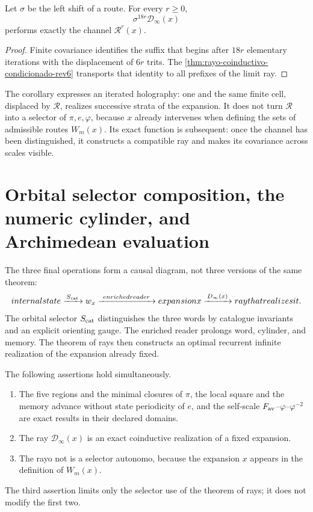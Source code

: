 \begin{corollary}
\label{cor:covarianza-rayo-729-rev6}
Let \(\sigma\) be the left shift of a route. For every
\(r\geq0\),
\[
\sigma^{18r}\mathcal D_\infty(x)
\]
performs exactly the channel \(\mathcal R^r(x)\).
\end{corollary}

\begin{proof}
Finite covariance identifies the suffix that begins after \(18r\)
elementary iterations
with the displacement of \(6r\) trits. The
\cref{thm:rayo-coinductivo-condicionado-rev6} transports that identity to
all prefixes of the limit ray.
\end{proof}

The corollary expresses an iterated holography: one and the same finite cell,
displaced by \(\mathcal R\), realizes successive strata of the expansion.
It does not turn \(\mathcal R\) into a selector of \(\pi,e,\varphi\), because
\(x\) already intervenes when defining the sets of admissible routes
\(W_m(x)\). Its exact function is subsequent: once the channel has been distinguished,
it constructs a compatible ray and makes its covariance across scales visible.

\section{Orbital selector composition, the numeric cylinder, and Archimedean evaluation}

The three final operations form a causal diagram, not three versions
of the same theorem:
\[
\text{internal state}
\xrightarrow{\,\mathfrak S_{\rm cat}\,}
w_x
\xrightarrow{\ \text{enriched reader}\ }
\text{expansion }x
\xrightarrow{\,\mathcal D_\infty(x)\,}
\text{ray that realizes it}.
\]
The orbital selector \(\mathfrak S_{\rm cat}\) distinguishes the three words
by catalogue invariants and an explicit orienting gauge. The enriched reader
prolongs word, cylinder, and memory. The theorem of rays
then constructs an optimal recurrent infinite realization of the expansion
already fixed.

\begin{proposition}
\label{prop:tipado-biografias-rayos-selector-rev6}
The following assertions hold simultaneously.
\begin{enumerate}
\item The five regions and the minimal closures of \(\pi\), the local square
and the memory advance without state periodicity of \(e\), and the self-scale
\(F_{\rm av}\)--\(\varphi\)--\(\varphi^{-2}\) are exact results in
their declared domains.
\item The ray \(\mathcal D_\infty(x)\) is an exact coinductive realization
of a fixed expansion.
\item The rayo not is a selector autonomo, because the expansion \(x\) appears
in the definition of \(W_m(x)\).
\end{enumerate}
The third assertion limits only the selector use of the theorem of
rays; it does not modify the first two.
\end{proposition}

